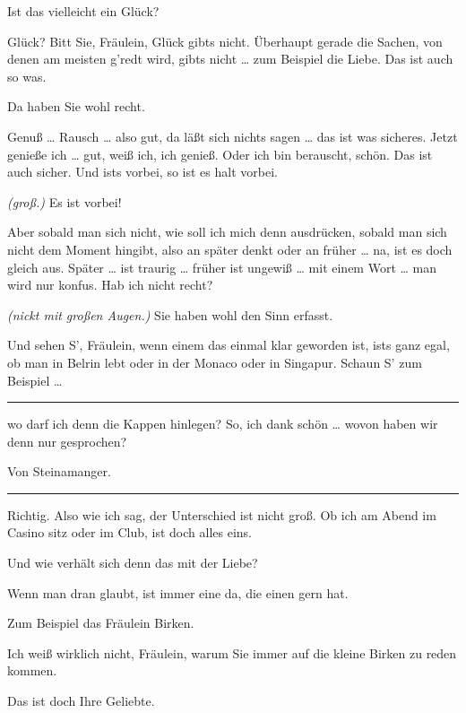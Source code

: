 \documentclass[
	final,
	a4paper,
	ngerman,
	mpinclude = true, %
	twoside = true,
	open = right,
	cleardoublepage = plain,
	DIV = 13,
	BCOR = 1cm,
	titlepage = firstiscover,
	]{scrbook}
\newcommand{\marginnote}[1]{\marginpar{\singlespacing\raggedright\footnotesize#1}}
\newcommand{\direction}[1]{\textit{(#1)}}
\newenvironment{deletion}{%
		\vspace{0.25\baselineskip}
		\hrule
		\vspace{0.25\baselineskip}
		\color{darkgray}
	}{
		\color{black}
		\vspace{0.25\baselineskip}
		\hrule 
		\vspace{0.25\baselineskip}
	}
\newcommand{\thecharacter}[1]{\textup{\textsc{#1}}\xspace}
\newcommand{\theschauspielerin}{\thecharacter{Daniela}}
\newcommand{\theentrepeneurin}{\thecharacter{Katerina Albrecht}}
\newcommand{\character}[1]{\item[#1:]}
\newcommand{\schauspielerin}{\character{\theschauspielerin}}
\newcommand{\entrepeneurin}{\character{\theentrepeneurin}}
\begin{document}
\begin{play}
	\schauspielerin
	Ist das vielleicht ein Glück?

	\entrepeneurin
	Glück? Bitt Sie, Fräulein, Glück gibts nicht. Überhaupt gerade die Sachen, von denen am meisten g'redt wird, gibts nicht \ldots{} zum Beispiel die Liebe. Das ist auch so was.

	\schauspielerin
	Da haben Sie wohl recht.

	\entrepeneurin
	Genuß \ldots{} Rausch \ldots{} also gut, da läßt sich nichts sagen \ldots{} das ist was sicheres. Jetzt genieße ich \ldots{} gut, weiß ich, ich genieß. Oder ich bin berauscht, schön. Das ist auch sicher. Und ists vorbei, so ist es halt vorbei.

	\schauspielerin
	\direction{groß.} Es ist vorbei!

	\entrepeneurin
	Aber sobald man sich nicht, wie soll ich mich denn ausdrücken, sobald man sich nicht dem Moment hingibt, also an später denkt oder an früher \ldots{} na, ist es doch gleich aus. Später \ldots{} ist traurig \ldots{} früher ist ungewiß \ldots{} mit einem Wort \ldots{} man wird nur konfus. Hab ich nicht recht?

	\marginnote{\enquote{Komm, zieh mich aus jetzt!}}
	\schauspielerin
	\direction{nickt mit großen Augen.} Sie haben wohl den Sinn erfasst.

	\entrepeneurin
	Und sehen S', Fräulein, wenn einem das einmal klar geworden ist, ists ganz egal, ob man in Belrin lebt oder in der Monaco oder in Singapur. Schaun S' zum Beispiel \ldots{}
	\begin{deletion}
		wo darf ich denn die Kappen hinlegen? So, ich dank schön \ldots{} wovon haben wir denn nur gesprochen?

	\schauspielerin
	Von Steinamanger.

	\entrepeneurin
	\end{deletion}
	Richtig. Also wie ich sag, der Unterschied ist nicht groß. Ob ich am Abend im Casino sitz oder im Club, ist doch alles eins.

	\schauspielerin
	Und wie verhält sich denn das mit der Liebe?

	\entrepeneurin
	Wenn man dran glaubt, ist immer eine da, die einen gern hat.

	\schauspielerin
	Zum Beispiel das Fräulein Birken.

	\entrepeneurin
	Ich weiß wirklich nicht, Fräulein, warum Sie immer auf die kleine Birken zu reden kommen.

	\schauspielerin
	Das ist doch Ihre Geliebte.


\end{play}
\end{document}

